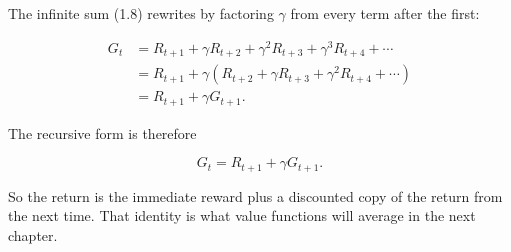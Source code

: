 The infinite sum (1.8) rewrites by factoring $\gamma$ from every term after the first:

\[
\begin{aligned}
G_t
&= R_{t+1} + \gamma R_{t+2} + \gamma^2 R_{t+3} + \gamma^3 R_{t+4} + \cdots \\
&= R_{t+1} + \gamma \left( R_{t+2} + \gamma R_{t+3} + \gamma^2 R_{t+4} + \cdots \right) \\
&= R_{t+1} + \gamma G_{t+1}.
\end{aligned}
\]

The recursive form is therefore

\begin{equation}
G_t = R_{t+1} + \gamma G_{t+1}.
\tag{1.10}
\end{equation}

So the return is the immediate reward plus a discounted copy of the return from the next time. That identity is what value functions will average in the next chapter.
